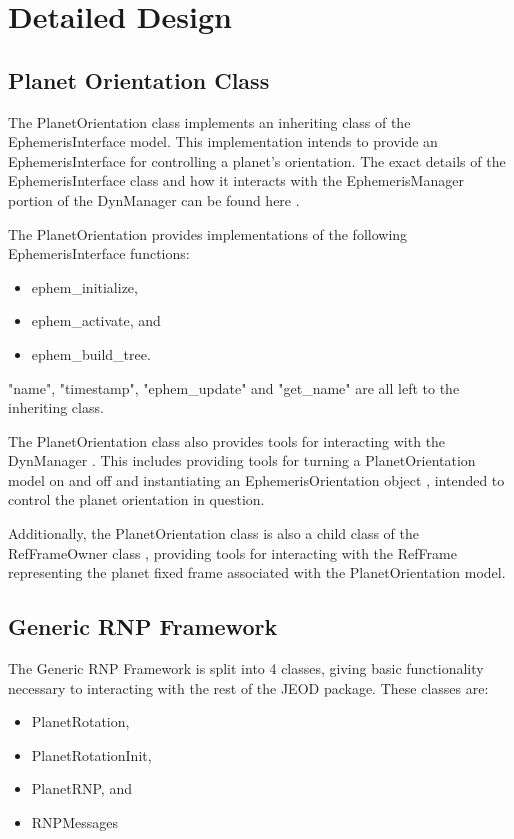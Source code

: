 \section{Detailed Design}

\subsection{Planet Orientation Class}

The PlanetOrientation class implements an inheriting class of the
EphemerisInterface model. This implementation intends to provide
an EphemerisInterface for controlling a planet's orientation.
The exact details of the EphemerisInterface class and how it interacts with
the EphemerisManager portion of the DynManager can be found here \cite{dynenv:EPHEMERIDES}.

The PlanetOrientation provides implementations of the following
EphemerisInterface functions:

\begin{itemize}
\item{ephem\_initialize,}
\item{ephem\_activate, and}
\item{ephem\_build\_tree.}
\end{itemize}

"name", "timestamp", "ephem\_update" and "get\_name"
are all left to the inheriting class.

The PlanetOrientation class also provides tools for interacting with
the DynManager \cite{dynenv:DYNMANAGER}.
This includes providing tools for turning a PlanetOrientation model
on and off and instantiating an EphemerisOrientation
object \cite{dynenv:EPHEMERIDES}, intended to control the planet orientation
in question.

Additionally, the PlanetOrientation class is also a child class of the RefFrameOwner
class \cite{dynenv:REFFRAMES}, providing tools for interacting with the RefFrame
representing the planet fixed frame associated with the PlanetOrientation model.

\subsection{Generic RNP Framework}

The Generic RNP Framework is split into 4 classes, giving basic functionality
necessary to interacting with the rest of the JEOD package. These classes
are:

\begin{itemize}
\item{PlanetRotation},
\item{PlanetRotationInit},
\item{PlanetRNP}, and
\item{RNPMessages}
\end{itemize}

